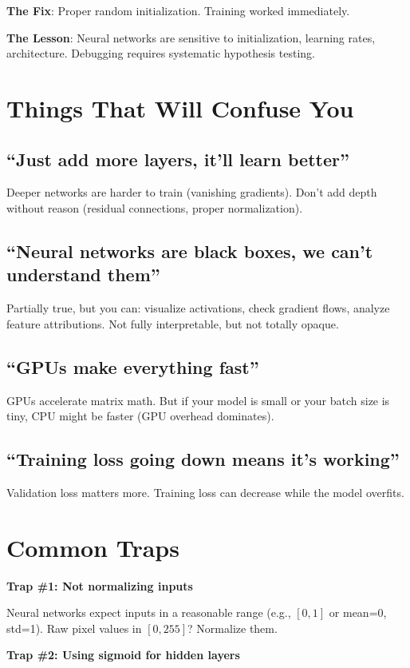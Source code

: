 \documentclass[11pt,oneside]{book}
\begin{document}
\textbf{The Fix}: Proper random initialization. Training worked immediately.

\textbf{The Lesson}: Neural networks are sensitive to initialization, learning rates, architecture. Debugging requires systematic hypothesis testing.

\section{Things That Will Confuse You}

\subsection{``Just add more layers, it'll learn better''}
Deeper networks are harder to train (vanishing gradients). Don't add depth without reason (residual connections, proper normalization).

\subsection{``Neural networks are black boxes, we can't understand them''}
Partially true, but you can: visualize activations, check gradient flows, analyze feature attributions. Not fully interpretable, but not totally opaque.

\subsection{``GPUs make everything fast''}
GPUs accelerate matrix math. But if your model is small or your batch size is tiny, CPU might be faster (GPU overhead dominates).

\subsection{``Training loss going down means it's working''}
Validation loss matters more. Training loss can decrease while the model overfits.

\section{Common Traps}

\textbf{Trap \#1: Not normalizing inputs}

Neural networks expect inputs in a reasonable range (e.g., $[0,1]$ or mean=0, std=1). Raw pixel values in $[0, 255]$? Normalize them.

\textbf{Trap \#2: Using sigmoid for hidden layers}
\end{document}
